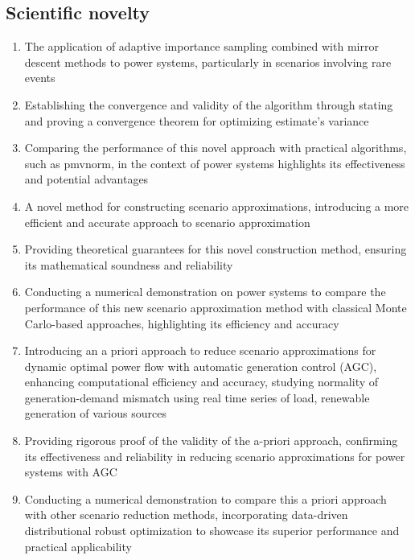 \subsection*{Scientific novelty}
\begin{enumerate}
    \item The application of adaptive importance sampling combined with mirror descent methods to power systems, particularly in scenarios involving rare events%
    \item Establishing the convergence and validity of the algorithm through stating and proving a convergence theorem for optimizing estimate's variance%
    \item Comparing the performance of this novel approach with practical algorithms, such as pmvnorm, in the context of power systems highlights its effectiveness and potential advantages%
    \item A novel method for constructing scenario approximations, introducing a more efficient and accurate approach to scenario approximation%
    \item Providing theoretical guarantees for this novel construction method, ensuring its mathematical soundness and reliability%
    \item Conducting a numerical demonstration on power systems to compare the performance of this new scenario approximation method with classical Monte Carlo-based approaches, highlighting its efficiency and accuracy%
    \item Introducing an a priori approach to reduce scenario approximations for dynamic optimal power flow with automatic generation control (AGC), enhancing computational efficiency and accuracy, studying normality of generation-demand mismatch using real time series of load, renewable generation of various sources%
    \item Providing rigorous proof of the validity of the a-priori approach, confirming its effectiveness and reliability in reducing scenario approximations for power systems with AGC%
    \item Conducting a numerical demonstration to compare this a priori approach with other scenario reduction methods, incorporating data-driven distributional robust optimization to showcase its superior performance and practical applicability%
\end{enumerate}

